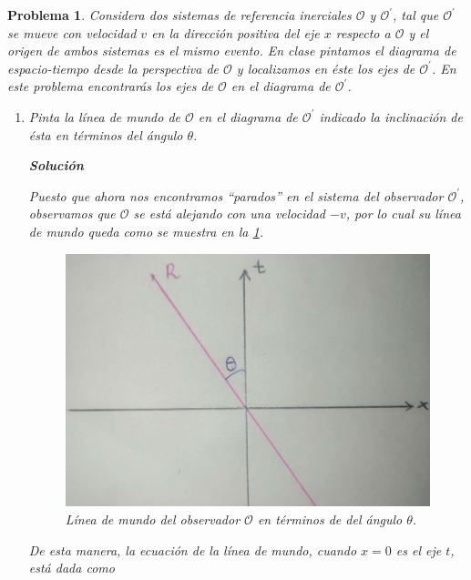\documentclass[12pt]{article}
\theoremstyle{break}
\newtheorem{exercise}{Problema}
\theoremstyle{nonumberbreak}
\newcommand*{\observer}{\mathcal{O}}
\newcommand*{\primeobserver}{\mathcal{O}^{\prime}}
\newcommand*{\inlinesol}{\vspace*{10pt}\textbf{Solución}\vspace*{10pt}}
\begin{document}
    \pagebreak
    \begin{exercise}
        Considera dos sistemas de referencia inerciales \(\observer\) y \(\primeobserver\), tal que \(\primeobserver\) se mueve con velocidad \(v\) en la dirección positiva del eje \(x\) respecto a \(\observer\) y el origen de ambos sistemas es el mismo evento. En clase pintamos el diagrama de espacio-tiempo desde la perspectiva de \(\observer\) y localizamos en éste los ejes de \(\primeobserver\). En este problema encontrarás los ejes de \(\observer\) en el diagrama de \(\primeobserver\).

        \begin{enumerate}[label = \alph*)]
            \item Pinta la línea de mundo de \(\observer\) en el diagrama de \(\primeobserver\) indicado la inclinación de ésta en términos del ángulo \(\theta\).
            
            \inlinesol

            Puesto que ahora nos encontramos ``parados'' en el sistema del observador \(\primeobserver\), observamos que \(\observer\) se está alejando con una velocidad \(-v\), por lo cual su línea de mundo queda como se muestra en la \cref{fig:lineamundoO}.

            \begin{figure}[htb]
                \centering
                \includegraphics[scale = 0.15]{fig-1}
                \caption{Línea de mundo del observador \(\observer\) en términos de del ángulo \(\theta\).}
                \label{fig:lineamundoO}
            \end{figure}

            De esta manera, la ecuación de la línea de mundo, cuando \(x = 0\) es el eje \(t\), está dada como


\end{enumerate}
\end{exercise}
\end{document}
